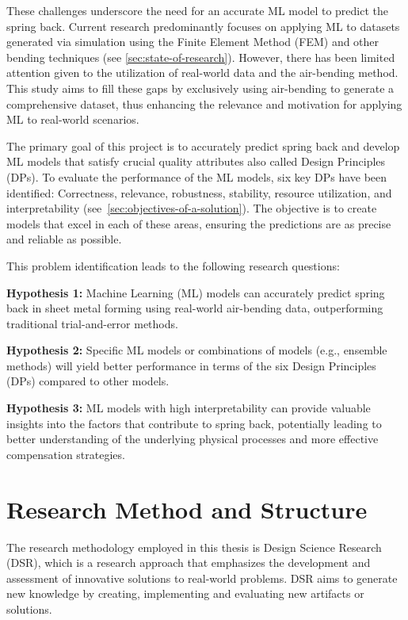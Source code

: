 These challenges underscore the need for an accurate ML model to predict the spring back.
Current research predominantly focuses on applying ML to datasets generated via simulation using the Finite Element
Method (FEM) and other bending techniques (see \cref{sec:state-of-research}).
However, there has been limited attention given to the utilization of real-world data and the air-bending method.
This study aims to fill these gaps by exclusively using air-bending to generate a comprehensive dataset, thus
enhancing the relevance and motivation for applying ML to real-world scenarios.

The primary goal of this project is to accurately predict spring back and develop \ac{ML} models that satisfy crucial
quality attributes also called Design Principles (DPs).
To evaluate the performance of the ML models, six key DPs have been identified:
Correctness, relevance, robustness, stability, resource utilization, and interpretability
(see~\ref{sec:objectives-of-a-solution}).
The objective is to create models that excel in each of these areas, ensuring the predictions are as precise and
reliable as possible.

This problem identification leads to the following research questions:

\begin{tcolorbox}[arc=0pt,boxrule=0.5pt]
    \textbf{Hypothesis 1:} Machine Learning (ML) models can accurately predict spring back in sheet metal forming using
    real-world air-bending data, outperforming traditional trial-and-error methods.

    \textbf{Hypothesis 2:} Specific ML models or combinations of models (e.g., ensemble methods) will yield better
    performance
    in terms of the six Design Principles (DPs) compared to other models.

    \textbf{Hypothesis 3:} ML models with high interpretability can provide valuable insights into the factors that
    contribute to spring back, potentially leading to better understanding of the underlying physical processes and
    more effective compensation strategies.
\end{tcolorbox}


\section{Research Method and Structure}\label{sec:research-method-and-structure}
The research methodology employed in this thesis is Design Science Research (DSR), which is a
research approach that emphasizes the development and assessment of innovative solutions to
real-world problems.
DSR aims to generate new knowledge by creating, implementing and evaluating new artifacts or
solutions.

